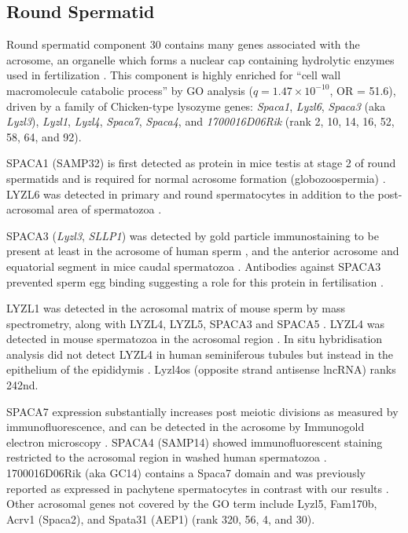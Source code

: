 \subsection{Round Spermatid}
Round spermatid component 30 contains many genes associated with the acrosome, an organelle which forms a nuclear cap containing hydrolytic enzymes used in fertilization \parencite{Ito2016Acrosome}.
This component is highly enriched for ``cell wall macromolecule catabolic process'' by GO analysis  ($q = 1.47\times10^{-10}$, OR = 51.6), driven by a family of Chicken-type lysozyme genes: \textit{Spaca1}, \textit{Lyzl6}, \textit{Spaca3} (aka \textit{Lyzl3}), \textit{Lyzl1}, \textit{Lyzl4}, \textit{Spaca7}, \textit{Spaca4}, and \textit{1700016D06Rik} (rank 2, 10, 14, 16, 52, 58, 64, and 92).

SPACA1 (SAMP32) is first detected as protein in mice testis at stage 2 of round spermatids and is required for normal acrosome formation (globozoospermia) \parencite{Hao2002SAMP32,Fujihara2012SPACA1deficient}.
LYZL6 was detected in primary and round spermatocytes in addition to the post-acrosomal area of spermatozoa \parencite{Wei2013Characterisation}.
 
SPACA3 (\textit{Lyzl3}, \textit{SLLP1}) was detected by gold particle immunostaining to be present at least in the acrosome of human sperm \parencite{Mandal2003SLLP1}, and the anterior acrosome and equatorial segment in mice caudal spermatozoa \parencite{Herrero2005Mouse}.
Antibodies against SPACA3 prevented sperm egg binding suggesting a role for this protein in fertilisation \parencite{Herrero2005Mouse}.

LYZL1 was detected in the acrosomal matrix of mouse sperm by mass spectrometry, along with LYZL4, LYZL5, SPACA3 and SPACA5 \parencite{Guyonnet2012Isolation}.
LYZL4 was detected in mouse spermatozoa in the acrosomal region \parencite{Sun2011Lyzl4}.
In situ hybridisation analysis did not detect LYZL4 in human seminiferous tubules but instead in the epithelium of the epididymis \parencite{Zhang2005Molecular}.
Lyzl4os (opposite strand antisense lncRNA) ranks 242nd.

SPACA7 expression substantially increases post meiotic divisions as measured by immunofluorescence, and can be detected in the acrosome by Immunogold electron microscopy \parencite{Korfanty2012Identification,Nguyen2014SPACA7}.
SPACA4 (SAMP14) showed immunofluorescent staining restricted to the acrosomal region in washed human spermatozoa \parencite{Shetty2003SAMP14}.
1700016D06Rik (aka GC14) contains a Spaca7 domain and was previously reported as expressed in pachytene spermatocytes in contrast with our results \parencite{Anway2003Expression}.
Other acrosomal genes not covered by the GO term include Lyzl5, Fam170b, Acrv1 (Spaca2), and Spata31 (AEP1) (rank 320, 56, 4, and 30).

